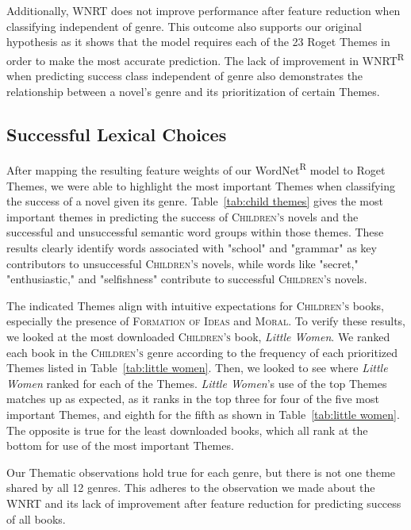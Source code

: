 

Additionally, WNRT does not improve performance after feature reduction when classifying independent of genre.
This outcome also supports our original hypothesis as it shows that the model requires each of the 23 Roget Themes in order to make the most accurate prediction.
The lack of improvement in WNRT\textsuperscript{R} when predicting success class independent of genre also demonstrates the relationship between a novel's genre and its prioritization of certain Themes.

\subsection*{Successful Lexical Choices}\label{subsec:successful lexical choices}

After mapping the resulting feature weights of our WordNet\textsuperscript{R} model to Roget Themes, we were able to highlight the most important Themes when classifying the success of a novel given its genre.
Table~\ref{tab:child themes} gives the most important themes in predicting the success of \textsc{Children's} novels and the successful and unsuccessful semantic word groups within those themes.
These results clearly identify words associated with "school" and "grammar" as key contributors to unsuccessful \textsc{Children's} novels, while words like "secret," "enthusiastic," and "selfishness" contribute to successful \textsc{Children's} novels.

The indicated Themes align with intuitive expectations for \textsc{Children's} books, especially the presence of \textsc{Formation of Ideas} and \textsc{Moral}.
To verify these results, we looked at the most downloaded \textsc{Children's} book, \textit{Little Women}.
We ranked each book in the \textsc{Children's} genre according to the frequency of each prioritized Themes listed in Table~\ref{tab:little women}.
Then, we looked to see where \textit{Little Women} ranked for each of the Themes.
\textit{Little Women}'s use of the top Themes matches up as expected, as it ranks in the top three for four of the five most important Themes, and eighth for the fifth as shown in Table~\ref{tab:little women}.
The opposite is true for the least downloaded books, which all rank at the bottom for use of the most important Themes.



Our Thematic observations hold true for each genre, but there is not one theme shared by all 12 genres.%
This adheres to the observation we made about the WNRT and its lack of improvement after feature reduction for predicting success of all books.